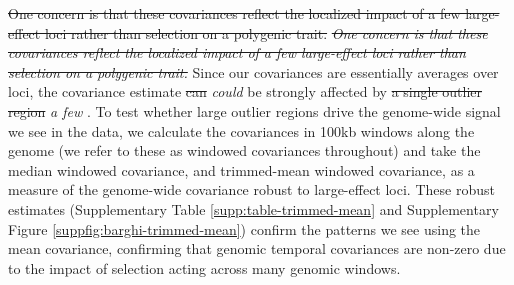 \documentclass[11pt]{article}
\newcommand{\vb}[1]{{\it \color{blue} #1}}
\newcommand{\vbout}[1]{{\it \color{blue} \sout{#1}}}
\providecommand{\DIFaddtex}[1]{{\protect\color{blue}\uwave{#1}}} %
\providecommand{\DIFdeltex}[1]{{\protect\color{red}\sout{#1}}}                      %
\providecommand{\DIFaddbegin}{} %
\providecommand{\DIFaddend}{} %
\providecommand{\DIFdelbegin}{} %
\providecommand{\DIFdelend}{} %
\providecommand{\DIFadd}[1]{\texorpdfstring{\DIFaddtex{#1}}{#1}} %
\providecommand{\DIFdel}[1]{\texorpdfstring{\DIFdeltex{#1}}{}} %
\begin{document}
\DIFdelbegin \DIFdel{One concern is that these covariances reflect the localized impact of a few
large-effect loci rather than selection on a polygenic trait. }\DIFdelend \DIFaddbegin \vbout{One concern is that these covariances reflect the localized impact of a
  few large-effect loci rather than selection on a polygenic trait.} \DIFaddend Since our
  covariances are essentially averages over loci, the covariance estimate \DIFdelbegin \DIFdel{can }\DIFdelend \DIFaddbegin \vb{could}
  \DIFaddend be strongly affected by \DIFdelbegin \DIFdel{a single outlier region}\DIFdelend \DIFaddbegin \vb{a few} \DIFadd{outlier regions}\DIFaddend . To test whether large
  outlier regions drive the genome-wide signal we see in the
  \textcite{Barghi2019-qy} data, we calculate the covariances in 100kb windows
  along the genome (we refer to these as windowed covariances throughout) and
  take the median windowed covariance, and trimmed-mean windowed covariance, as
  a measure of the genome-wide covariance robust to large-effect loci. These
  robust estimates (Supplementary Table \ref{supp:table-trimmed-mean} and
  Supplementary Figure \ref{suppfig:barghi-trimmed-mean}) confirm the patterns
  we see using the mean covariance, confirming that genomic temporal
  covariances are non-zero due to the impact of selection acting across many
  genomic windows. 
\end{document}
